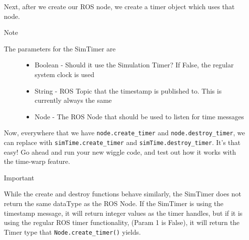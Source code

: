 Next, after we create our ROS node, we create a timer object which uses
that node.

\begin{Shaded}
\begin{Highlighting}[]
\OperatorTok{=}\NormalTok{, }
\end{Highlighting}
\end{Shaded}

Note

\begin{description}
\item[The parameters for the SimTimer are]
\begin{itemize}
\tightlist
\item
  Boolean - Should it use the Simulation Timer? If False, the regular
  system clock is used
\item
  String - ROS Topic that the timestamp is published to. This is
  currently always the same
\item
  Node - The ROS Node that should be used to listen for time messages
\end{itemize}
\end{description}

Now, everywhere that we have \texttt{node.create\_timer} and
\texttt{node.destroy\_timer}, we can replace with
\texttt{simTime.create\_timer} and \texttt{simTime.destroy\_timer}. It's
that easy! Go ahead and run your new wiggle code, and test out how it
works with the time-warp feature.

Important

While the create and destroy functions behave similarly, the SimTimer
does not return the same dataType as the ROS Node. If the SimTimer is
using the timestamp message, it will return integer values as the timer
handles, but if it is using the regular ROS timer functionality, (Param
1 is False), it will return the Timer type that
\texttt{Node.create\_timer()} yields.

